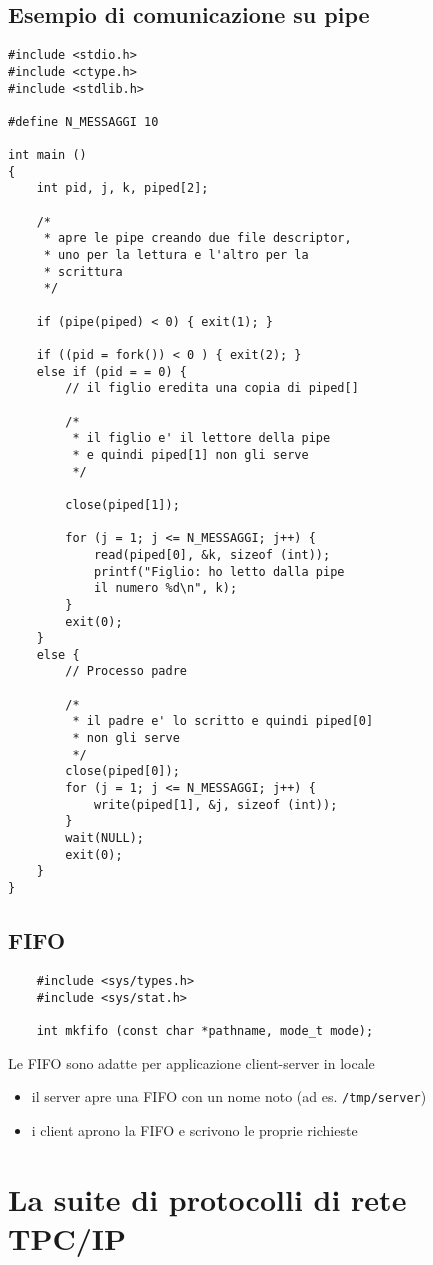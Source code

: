 \documentclass[italian,12pt,a4paper]{article}
\begin{document}
\subsection{Esempio di comunicazione su pipe}
\begin{lstlisting}
#include <stdio.h>
#include <ctype.h>
#include <stdlib.h>

#define N_MESSAGGI 10

int main ()
{
	int pid, j, k, piped[2];
	
	/*
	 * apre le pipe creando due file descriptor,
	 * uno per la lettura e l'altro per la
	 * scrittura
	 */
	
	if (pipe(piped) < 0) { exit(1); }
	
	if ((pid = fork()) < 0 ) { exit(2); }
	else if (pid = = 0) {
		// il figlio eredita una copia di piped[]
		
		/* 
		 * il figlio e' il lettore della pipe
		 * e quindi piped[1] non gli serve
		 */
		 
		close(piped[1]);
		
		for (j = 1; j <= N_MESSAGGI; j++) {
			read(piped[0], &k, sizeof (int));
			printf("Figlio: ho letto dalla pipe 
			il numero %d\n", k);
		}
		exit(0);		 
	} 
	else {
		// Processo padre
		
		/*
		 * il padre e' lo scritto e quindi piped[0]
		 * non gli serve
		 */
		close(piped[0]);
		for (j = 1; j <= N_MESSAGGI; j++) {
			write(piped[1], &j, sizeof (int));
		}
		wait(NULL);
		exit(0);
	}
}
\end{lstlisting}
\subsection{FIFO}
\begin{verbatim}
	#include <sys/types.h>
	#include <sys/stat.h>
	
	int mkfifo (const char *pathname, mode_t mode);
\end{verbatim}
Le FIFO sono adatte per applicazione client-server in locale
\begin{itemize}
	\item il server apre una FIFO con un nome noto (ad es. \verb|/tmp/server|)
	\item i client aprono la FIFO e scrivono le proprie richieste
\end{itemize}
\section{La suite di protocolli di rete TPC/IP}
\end{document}
